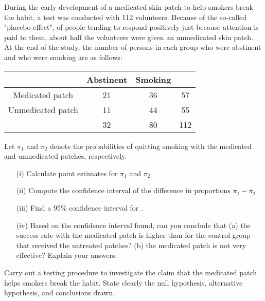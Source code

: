\item 
 During the early development of a medicated skin patch to help smokers break the habit, a test was conducted with 112 volunteers.  Because of the so-called
 "placebo effect", of people tending to respond positively just because attention is paid to them, about half the volunteers were given an unmedicated skin patch.  At the end of the study, the number of persons in each group who were abstinent and who were smoking are as follows:
 
 \begin{center}
 \begin{tabular}{|c|c|c|c|}
 \hline
 	& Abstinent  &Smoking   & \\ \hline
 	
 	Medicated patch&  21 &36   &57\\ \hline 
 	
 	Unmedicated patch  &   11   &  44   &55\\ \hline 
 	
 	&   32   &  80&  112\\ \hline
 \end{tabular} 
 \end{center}
 
 Let $\pi_1$ and $\pi_2$ denote the probabilities of quitting smoking with the medicated and unmedicated patches, respectively.
 
 \begin{itemize}
 	\item[(i)] Calculate point estimates for $\pi_1$ and $\pi_2$ 
 	
 	\item[(ii)] Compute the confidence interval of the difference in proportions $\pi_1 - \pi_2$ 
 	
 	\item[(iii)]Find a 95\% confidence interval for  .
 	\item[(iv)]  Based on the confidence interval found, can you conclude that (a) the success rate with the medicated patch is higher than for the control group that received the untreated patches?  (b) the medicated patch is not very effective?  Explain your answers.
 \end{itemize}

 
 Carry out a testing procedure to investigate the claim that the medicated patch helps smokers break the habit.  State clearly the null hypothesis, alternative hypothesis, and conclusions drawn.

